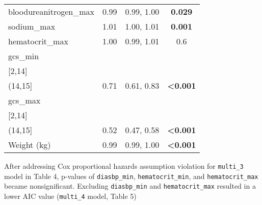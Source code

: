 \documentclass[
]{article}
\begin{document}
\begin{longtable}[]{@{}lccc@{}}
bloodureanitrogen\_max & 0.99 & 0.99, 1.00 & \textbf{0.029} \\
sodium\_max & 1.01 & 1.00, 1.01 & \textbf{0.001} \\
hematocrit\_max & 1.00 & 0.99, 1.01 & 0.6 \\
gcs\_min & & & \\
{[}2,14{]} & & & \\
(14,15{]} & 0.71 & 0.61, 0.83 & \textbf{\textless0.001} \\
gcs\_max & & & \\
{[}2,14{]} & & & \\
(14,15{]} & 0.52 & 0.47, 0.58 & \textbf{\textless0.001} \\
Weight (kg) & 0.99 & 0.99, 1.00 & \textbf{\textless0.001} \\
\end{longtable}

After addressing Cox proportional hazards assumption violation for
\texttt{multi\_3} model in Table 4, p-values of \texttt{diasbp\_min},
\texttt{hematocrit\_min}, and \texttt{hematocrit\_max} became
nonsignificant. Excluding \texttt{diasbp\_min} and
\texttt{hematocrit\_max} resulted in a lower AIC value
(\texttt{multi\_4} model, Table 5)
\end{document}
